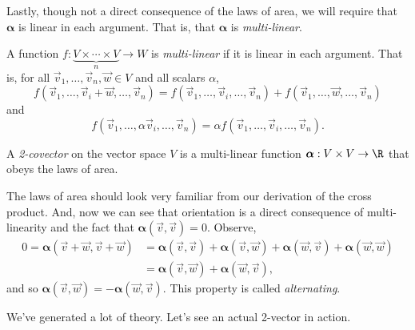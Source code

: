 Lastly, though not a direct consequence of the laws of area,
we will require that $\bm\alpha$ is linear in each argument.
That is, that $\bm\alpha$ is \emph{multi-linear}.

\begin{definition}
	A function $f:\underbrace{V\times \cdots\times V}_{n}\to W$ is
	\emph{multi-linear} if it is linear in each argument.
	That is, for all $\vec v_1,\ldots, \vec v_n,\vec w\in V$ and 
	all scalars $\alpha$,
	\[
		f(\vec v_1,\ldots,\vec v_i+\vec w,\ldots,\vec v_n)
		=
		f(\vec v_1,\ldots,\vec v_i,\ldots,\vec v_n) +
		f(\vec v_1,\ldots,\vec w,\ldots,\vec v_n)
	\]
	and
	\[
		f(\vec v_1,\ldots,\alpha\vec v_i,\ldots,\vec v_n)
		=
		\alpha f(\vec v_1,\ldots,\vec v_i,\ldots,\vec v_n).
	\]
\end{definition}

\begin{definition}[2-covector]
	A \emph{2-covector} on the vector space $V$ is a multi-linear
	function $\bm\alpha: V\times V\to \R$ that obeys the laws of area.
\end{definition}

The laws of area should look very familiar from our 
derivation of the cross product.  And, now we can see that orientation
is a direct consequence of multi-linearity and the fact that $\bm\alpha(\vec v,\vec v)=0$.
Observe,
\begin{align*}
	0=\bm\alpha(\vec v+\vec w, \vec v+\vec w) &= 
		\bm\alpha(\vec v, \vec v)+
		\bm\alpha(\vec v, \vec w)+
		\bm\alpha(\vec w, \vec v)+
		\bm\alpha(\vec w,\vec w)\\
		&=\bm\alpha(\vec v, \vec w)+
		\bm\alpha(\vec w, \vec v),
\end{align*}
and so $\bm\alpha(\vec v, \vec w) = -\bm\alpha(\vec w, \vec v)$.  This property
is called \emph{alternating}.

We've generated a lot of theory. Let's see an actual 2-vector in action.

